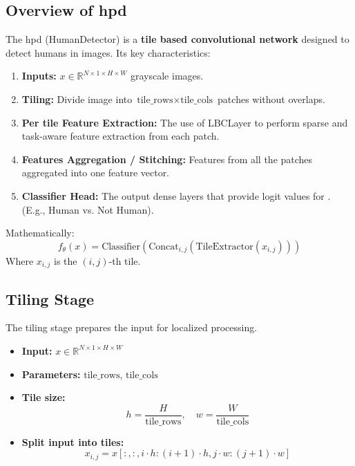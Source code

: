 \subsection*{Overview of \gls{hpd}}
The \gls{hpd} (HumanDetector) is a \textbf{tile based convolutional network} designed to detect humans in images. Its key characteristics:
\begin{enumerate}
    \item \textbf{Inputs:} $x \in \mathbb{R}^{N \times 1 \times H \times W}$ grayscale images. 
    \item \textbf{Tiling:} Divide image into $\text{tile\_rows} \times \text{tile\_cols}$ patches without overlaps.
    \item \textbf{Per tile Feature Extraction:}  The use of LBCLayer to perform sparse and task-aware feature extraction from each patch.
    \item \textbf{Features Aggregation / Stitching:} Features from all the patches aggregated into one feature vector.
    \item \textbf{Classifier Head:} The output dense layers that provide logit values for \texttt{}. (E.g., Human vs. Not Human).
\end{enumerate}

Mathematically:
\begin{equation}
f_{\theta}(x) = \text{Classifier} \left( \text{Concat}_{i,j} (\text{TileExtractor}(x_{i,j})) \right)
\end{equation}
Where $x_{i,j}$ is the $(i, j)$-th tile.

\subsection*{Tiling Stage}
The tiling stage prepares the input for localized processing.
\begin{itemize}
    \item \textbf{Input:} $x \in \mathbb{R}^{N \times 1 \times H \times W}$
    \item \textbf{Parameters:} $\text{tile\_rows}$, $\text{tile\_cols}$
    \item \textbf{Tile size:}
    \begin{equation}
    h = \frac{H}{\text{tile\_rows}}, \quad w = \frac{W}{\text{tile\_cols}}
    \end{equation}
    \item \textbf{Split input into tiles:}
    \begin{equation}
    x_{i,j} = x[:, :, i \cdot h : (i+1) \cdot h, j \cdot w : (j+1) \cdot w]
    \end{equation}
\end{itemize}

